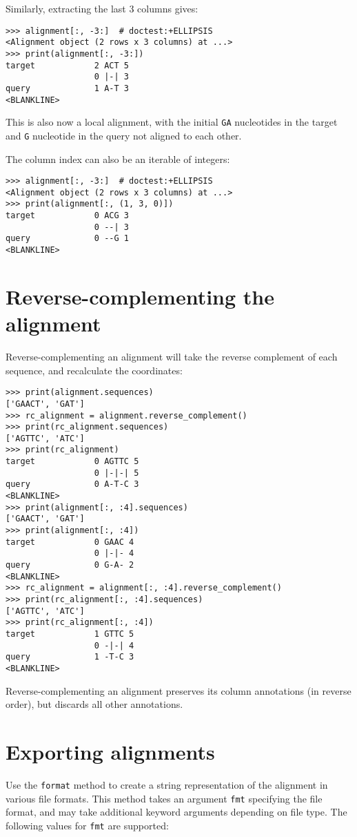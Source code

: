 Similarly, extracting the last 3 columns gives:
\begin{verbatim}
>>> alignment[:, -3:]  # doctest:+ELLIPSIS
<Alignment object (2 rows x 3 columns) at ...>
>>> print(alignment[:, -3:])
target            2 ACT 5
                  0 |-| 3
query             1 A-T 3
<BLANKLINE>
\end{verbatim}
This is also now a local alignment, with the initial \verb+GA+ nucleotides in the target and \verb+G+ nucleotide in the query not aligned to each other.

The column index can also be an iterable of integers:
\begin{verbatim}
>>> alignment[:, -3:]  # doctest:+ELLIPSIS
<Alignment object (2 rows x 3 columns) at ...>
>>> print(alignment[:, (1, 3, 0)])
target            0 ACG 3
                  0 --| 3
query             0 --G 1
<BLANKLINE>
\end{verbatim}

\section{Reverse-complementing the alignment}

Reverse-complementing an alignment will take the reverse complement of each sequence, and recalculate the coordinates:
\begin{verbatim}
>>> print(alignment.sequences)
['GAACT', 'GAT']
>>> rc_alignment = alignment.reverse_complement()
>>> print(rc_alignment.sequences)
['AGTTC', 'ATC']
>>> print(rc_alignment)
target            0 AGTTC 5
                  0 |-|-| 5
query             0 A-T-C 3
<BLANKLINE>
>>> print(alignment[:, :4].sequences)
['GAACT', 'GAT']
>>> print(alignment[:, :4])
target            0 GAAC 4
                  0 |-|- 4
query             0 G-A- 2
<BLANKLINE>
>>> rc_alignment = alignment[:, :4].reverse_complement()
>>> print(rc_alignment[:, :4].sequences)
['AGTTC', 'ATC']
>>> print(rc_alignment[:, :4])
target            1 GTTC 5
                  0 -|-| 4
query             1 -T-C 3
<BLANKLINE>
\end{verbatim}
Reverse-complementing an alignment preserves its column annotations (in reverse order), but discards all other annotations.

\section{Exporting alignments}

Use the \verb+format+ method to create a string representation of the alignment in various file formats. This method takes an argument \verb+fmt+ specifying the file format, and may take additional keyword arguments depending on file type. The following values for \verb+fmt+ are supported:

